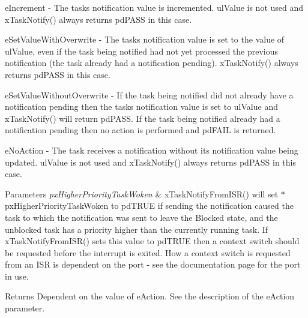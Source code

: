 e\+Increment -\/ The task\textquotesingle{}s notification value is incremented. ul\+Value is not used and x\+Task\+Notify() always returns pd\+P\+A\+SS in this case.

e\+Set\+Value\+With\+Overwrite -\/ The task\textquotesingle{}s notification value is set to the value of ul\+Value, even if the task being notified had not yet processed the previous notification (the task already had a notification pending). x\+Task\+Notify() always returns pd\+P\+A\+SS in this case.

e\+Set\+Value\+Without\+Overwrite -\/ If the task being notified did not already have a notification pending then the task\textquotesingle{}s notification value is set to ul\+Value and x\+Task\+Notify() will return pd\+P\+A\+SS. If the task being notified already had a notification pending then no action is performed and pd\+F\+A\+IL is returned.

e\+No\+Action -\/ The task receives a notification without its notification value being updated. ul\+Value is not used and x\+Task\+Notify() always returns pd\+P\+A\+SS in this case.


\begin{DoxyParams}{Parameters}
{\em px\+Higher\+Priority\+Task\+Woken} & x\+Task\+Notify\+From\+I\+S\+R() will set $\ast$px\+Higher\+Priority\+Task\+Woken to pd\+T\+R\+UE if sending the notification caused the task to which the notification was sent to leave the Blocked state, and the unblocked task has a priority higher than the currently running task. If x\+Task\+Notify\+From\+I\+S\+R() sets this value to pd\+T\+R\+UE then a context switch should be requested before the interrupt is exited. How a context switch is requested from an I\+SR is dependent on the port -\/ see the documentation page for the port in use.\\
\hline
\end{DoxyParams}
\begin{DoxyReturn}{Returns}
Dependent on the value of e\+Action. See the description of the e\+Action parameter. 
\end{DoxyReturn}
